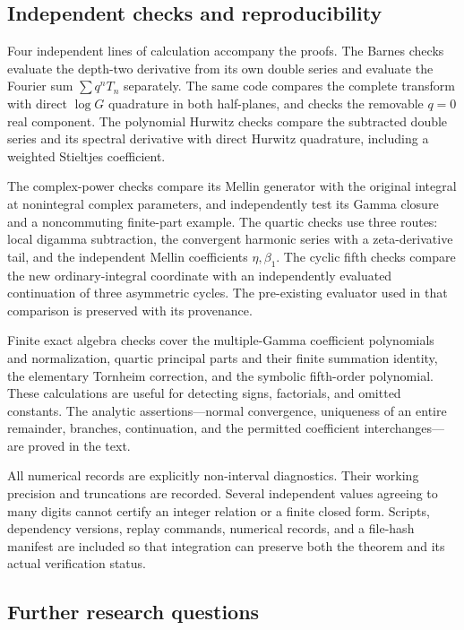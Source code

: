 \subsection{Independent checks and reproducibility}

Four independent lines of calculation accompany the proofs.
The Barnes checks evaluate the depth-two derivative from its own
double series and evaluate the Fourier sum $\sum q^nT_n$ separately.
The same code compares the complete transform with direct
$\log G$ quadrature in both half-planes, and checks the removable
$q=0$ real component. The polynomial Hurwitz checks compare the
subtracted double series and its spectral derivative with direct
Hurwitz quadrature, including a weighted Stieltjes coefficient.

The complex-power checks compare its Mellin generator with the
original integral at nonintegral complex parameters, and independently
test its Gamma closure and a noncommuting finite-part example.
The quartic checks use three routes: local digamma subtraction,
the convergent harmonic series with a zeta-derivative tail, and
the independent Mellin coefficients $\eta,\beta_1$.
The cyclic fifth checks compare the new ordinary-integral coordinate
with an independently evaluated continuation of three asymmetric
cycles. The pre-existing evaluator used in that comparison is
preserved with its provenance.

Finite exact algebra checks cover the multiple-Gamma coefficient
polynomials and normalization, quartic principal parts and their
finite summation identity, the elementary Tornheim correction,
and the symbolic fifth-order polynomial. These calculations are
useful for detecting signs, factorials, and omitted constants.
The analytic assertions---normal convergence, uniqueness of an
entire remainder, branches, continuation, and the permitted
coefficient interchanges---are proved in the text.

All numerical records are explicitly non-interval diagnostics.
Their working precision and truncations are recorded. Several
independent values agreeing to many digits cannot certify an
integer relation or a finite closed form. Scripts, dependency
versions, replay commands, numerical records, and a file-hash
manifest are included so that integration can preserve both the
theorem and its actual verification status.

\subsection{Further research questions}

